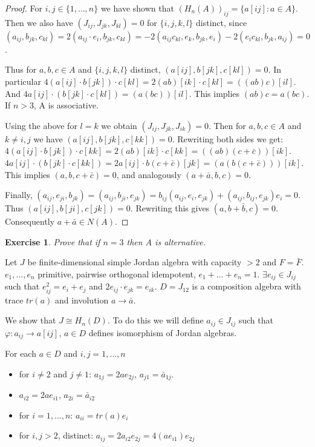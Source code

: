 \documentclass{article}
\newtheorem{exercise}[theorem]{Exercise}
\begin{document}
\begin{proof}  
For $i,j \in \{1, \dots, n\}$ we have shown that $(H_n(A))_{ij} = \{a[ij]: a \in A\}$. Then we also have $(J_{ij}, J_{jk}, J_{kl})=0$ for $\{i,j,k,l\}$ distinct, since $(a_{ij}, b_{jk}, c_{kl}) = 2(a_{ij} \cdot e_i, b_{jk}, c_{kl}) = -2(a_{ij} c_{kl}, e_k, b_{jk}, e_i)  -2(e_i c_{kl}, b_{jk}, a_{ij}) = 0$.  

Thus for $a,b,c \in A$ and $\{i,j,k,l\}$ distinct, $(a[ij], b[jk], c[kl])=0$. In particular $4(a[ij] \cdot b[jk]) \cdot c[kl] = 2(ab)[ik] \cdot c[kl] = ((ab)c)[il]$. And $4 a[ij] \cdot (b[jk] \cdot c[kl]) = (a(bc))[il]$. This implies $(ab)c = a(bc)$. If $n > 3$, A is associative.  

Using the above for $l=k$ we obtain $(J_{ij}, J_{jk}, J_{ik}) = 0$. Then for $a,b,c \in A$ and $k \ne i,j$ we have $(a[ij], b[jk], c[kk])=0$. Rewriting both sides we get: $4(a[ij] \cdot b[jk]) \cdot c[kk] = 2(ab)[ik] \cdot c[kk] = ((ab)(c+\bar{c}))[ik]$. $4 a[ij] \cdot (b[jk] \cdot c[kk]) = 2a[ij] \cdot b(c+\bar{c})[jk] = (a(b(c+\bar{c})))[ik]$. This implies $(a,b,c+\bar{c})=0$, and analogously $(a+\bar{a},b,c)=0$.  

Finally, $(a_{ij}, e_{ji}, b_{jk}) = (a_{ij}, b_{ji}, e_{jk}) = b_{ij}(a_{ij}, e_i, e_{jk}) + (a_{ij}, b_{ij}, e_{jk})e_i = 0$. Thus $(a[ij], b[ji], c[jk]) = 0$. Rewriting this gives $(a, b+\bar{b}, c)=0$. Consequently $a+\bar{a} \in N(A)$.   
\end{proof}  

\begin{exercise}
Prove that if $ n=3 $ then $ A $ is alternative.  
\end{exercise}

Let $J$ be finite-dimensional simple Jordan algebra with capacity $> 2$ and $F=\bar{F}$. $e_1, \dots, e_n$ primitive, pairwise orthogonal idempotent, $e_1+\dots+e_n=1$. $\exists e_{ij} \in J_{ij}$ such that $e_{ij}^2=e_i+e_j$ and $2e_{ij} \cdot e_{jk} = e_{ik}$. $D=J_{12}$ is a composition algebra with trace $tr(a)$ and involution $a \to \bar{a}$.  

We show that $J \cong H_n(D)$. To do this we will define $a_{ij} \in J_{ij}$ such that $\varphi: a_{ij} \to a[ij]$, $a \in D$ defines isomorphism of Jordan algebras.  

For each $a \in D$ and $i,j=1, \dots, n$  
\begin{itemize}  
    \item for $i \ne 2$ and $j \ne 1$: \quad $a_{1j} = 2ae_{2j}$, \quad $a_{j1} = \bar{a}_{1j}$.  
    \item $a_{i2}=2ae_{i1}$, \quad $a_{2i}=\bar{a}_{i2}$  
    \item for $i=1, \dots, n$: \quad $a_{ii} = tr(a)e_i$  
    \item for $i,j > 2$, distinct: \quad $a_{ij} = 2a_{i2}e_{2j} = 4(ae_{i1})e_{2j}$ 
\end{itemize}
\end{document}
